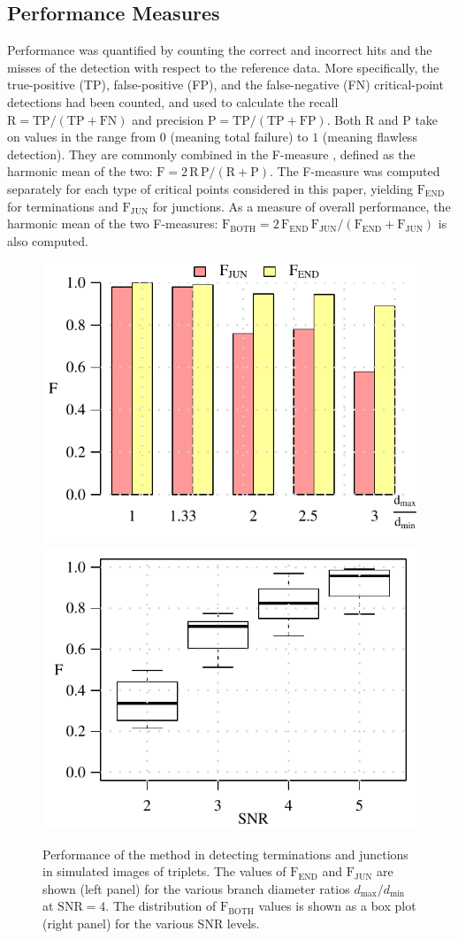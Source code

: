 \subsection{Performance Measures}
\label{subsec:performance-measures}
Performance was quantified by counting the correct and incorrect hits and the misses of the detection with respect to the reference data. More specifically, the true-positive (TP), false-positive (FP), and the false-negative (FN) critical-point detections had been counted, and used to calculate the recall $\textrm{R}=\textrm{TP}/(\textrm{TP}+\textrm{FN})$ and precision $\textrm{P}=\textrm{TP}/(\textrm{TP}+\textrm{FP})$. Both R and P take on values in the range from $0$ (meaning total failure) to $1$ (meaning flawless detection). They are commonly combined in the F-measure \cite{powers2011evaluation}, defined as the harmonic mean of the two: $\textrm{F}=2\,\textrm{R}\,\textrm{P}/(\textrm{R}+\textrm{P})$. The F-measure was computed separately for each type of critical points considered in this paper, yielding $\textrm{F}_{\textrm{END}}$ for terminations and $\textrm{F}_{\textrm{JUN}}$ for junctions. As a measure of overall performance, the harmonic mean of the two F-measures: $\textrm{F}_{\textrm{BOTH}}=2\,\textrm{F}_{\textrm{END}}\,\textrm{F}_{\textrm{JUN}}/(\textrm{F}_{\textrm{END}}+\textrm{F}_{\textrm{JUN}})$ is also computed.

\begin{figure}[!b]
	\centering
	\includegraphics[width=0.48\linewidth]{triplets_fjun_fend_vs_pratio}\hfill
	\includegraphics[width=0.48\linewidth]{triplets_fboth_vs_snr}
	\caption{Performance of the method in detecting terminations and junctions in simulated images of triplets. The values of $\textrm{F}_{\textrm{END}}$ and $\textrm{F}_{\textrm{JUN}}$ are shown (left panel) for the various branch diameter ratios $d_{\max}/d_{\min}$ at $\textrm{SNR} = 4$. The distribution of $\textrm{F}_{\textrm{BOTH}}$ values is shown as a box plot (right panel) for the various SNR levels.}
	\label{fig:results-triplets}
\end{figure}

